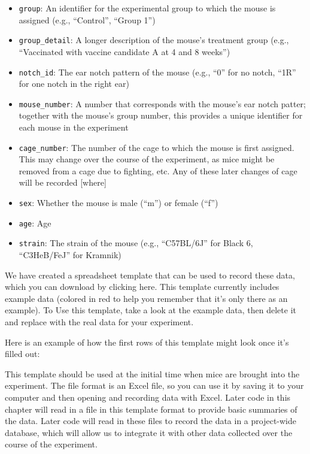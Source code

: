 \documentclass[
]{book}
\providecommand{\tightlist}{%
  \setlength{\itemsep}{0pt}\setlength{\parskip}{0pt}}
\begin{document}
\begin{itemize}
\tightlist
\item
  \texttt{group}: An identifier for the experimental group to which the mouse
  is assigned (e.g., ``Control'', ``Group 1'')
\item
  \texttt{group\_detail}: A longer description of the mouse's treatment group
  (e.g., ``Vaccinated with vaccine candidate A at 4 and 8 weeks'')
\item
  \texttt{notch\_id}: The ear notch pattern of the mouse (e.g., ``0'' for no notch,
  ``1R'' for one notch in the right ear)
\item
  \texttt{mouse\_number}: A number that corresponds with the mouse's ear notch patter;
  together with the mouse's group number, this provides
  a unique identifier for each mouse in the experiment
\item
  \texttt{cage\_number}: The number of the cage to which the mouse is first assigned.
  This may change over the course of the experiment, as mice might be removed from
  a cage due to fighting, etc. Any of these later changes of cage will be
  recorded {[}where{]}
\item
  \texttt{sex}: Whether the mouse is male (``m'') or female (``f'')
\item
  \texttt{age}: Age
\item
  \texttt{strain}: The strain of the mouse (e.g., ``C57BL/6J'' for Black 6, ``C3HeB/FeJ'' for
  Kramnik)
\end{itemize}

We have created a spreadsheet template that can be used to record these data,
which you can download by clicking here. This template currently includes
example data (colored in red to help you remember that it's only there as an
example). To Use this template, take a look at the example data, then delete it
and replace with the real data for your experiment.

Here is an example of how the first rows of this template might look once it's
filled out:

This template should be used at the
initial time when mice are brought into the experiment. The file format is an
Excel file, so you can use it by saving it to your computer and then opening and
recording data with Excel. Later code in this chapter will read in a file in
this template format to provide basic summaries of the data. Later code will
read in these files to record the data in a project-wide database, which will
allow us to integrate it with other data collected over the course of the
experiment.
\end{document}
